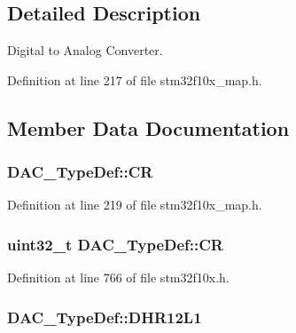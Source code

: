 \subsection{Detailed Description}
Digital to Analog Converter. 

Definition at line 217 of file stm32f10x\+\_\+map.\+h.



\subsection{Member Data Documentation}
\subsubsection[{\texorpdfstring{CR}{CR}}]{ D\+A\+C\+\_\+\+Type\+Def\+::\+CR}\hypertarget{struct_d_a_c___type_def_a7794f8bc0b891040b260ee3d9d5812c7}{}\label{struct_d_a_c___type_def_a7794f8bc0b891040b260ee3d9d5812c7}


Definition at line 219 of file stm32f10x\+\_\+map.\+h.

\subsubsection[{\texorpdfstring{CR}{CR}}]{ {\bf uint32\+\_\+t} D\+A\+C\+\_\+\+Type\+Def\+::\+CR}\hypertarget{struct_d_a_c___type_def_a394324f0b573837ca15a87127b2a37ea}{}\label{struct_d_a_c___type_def_a394324f0b573837ca15a87127b2a37ea}


Definition at line 766 of file stm32f10x.\+h.

\subsubsection[{\texorpdfstring{D\+H\+R12\+L1}{DHR12L1}}]{ D\+A\+C\+\_\+\+Type\+Def\+::\+D\+H\+R12\+L1}\hypertarget{struct_d_a_c___type_def_a7c016a47cfb4f768e7048337bfe83b5f}{}\label{struct_d_a_c___type_def_a7c016a47cfb4f768e7048337bfe83b5f}


